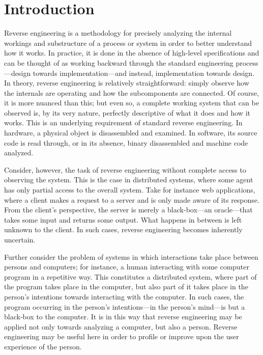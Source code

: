 \chapter{Introduction}

Reverse engineering is a methodology for precisely analyzing the internal workings and substructure of a process or system in order to better understand how it works.
In practice, it is done in the absence of high-level specifications and can be thought of as working backward through the standard engineering process---design towards implementation---and instead, implementation towards design.
In theory, reverse engineering is relatively straightforward: simply observe how the internals are operating and how the subcomponents are connected.
Of course, it is more nuanced than this; but even so, a complete working system that can be observed is, by its very nature, perfectly descriptive of what it does and how it works.
This is an underlying requirement of standard reverse engineering.
In hardware, a physical object is disassembled and examined.
In software, its source code is read through, or in its absence, binary disassembled and machine code analyzed.

Consider, however, the task of reverse engineering without complete access to observing the system.
This is the case in distributed systems, where some agent has only partial access to the overall system.
Take for instance web applications, where a client makes a request to a server and is only made aware of its response.
From the client's perspective, the server is merely a black-box---an oracle---that takes some input and returns some output.
What happens in between is left unknown to the client.
In such cases, reverse engineering becomes inherently uncertain.

Further consider the problem of systems in which interactions take place between persons and computers; for instance, a human interacting with some computer program in a repetitive way.
This constitutes a distributed system, where part of the program takes place in the computer, but also part of it takes place in the person's intentions towards interacting with the computer.
In such cases, the program occurring in the person's intentions---in the person's mind---is but a black-box to the computer.
It is in this way that reverse engineering may be applied not only towards analyzing a computer, but also a person.
Reverse engineering may be useful here in order to profile or improve upon the user experience of the person.

